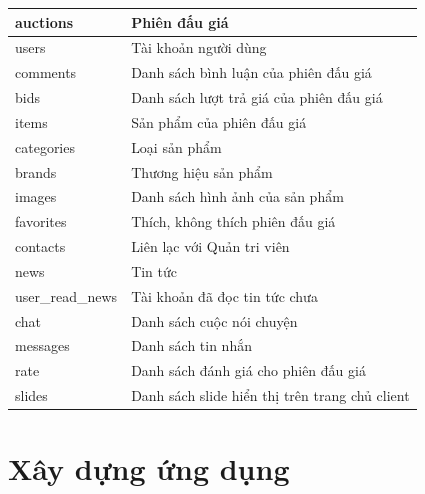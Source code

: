 \documentclass[../DoAn.tex]{subfiles}
\begin{document}
    \begin{supertabular}{| p{.30\textwidth} | p{.63\textwidth} |} 
    \hline
        auctions & Phiên đấu giá\\\hline
        users & Tài khoản người dùng\\\hline
        comments & Danh sách bình luận của phiên đấu giá\\\hline
        bids& Danh sách lượt trả giá của phiên đấu giá\\\hline
        items& Sản phẩm của phiên đấu giá\\\hline
        categories& Loại sản phẩm\\\hline
        brands& Thương hiệu sản phẩm\\\hline
        images& Danh sách hình ảnh của sản phẩm\\\hline
        favorites& Thích, không thích phiên đấu giá\\\hline
        contacts& Liên lạc với Quản tri viên\\\hline
        news& Tin tức\\\hline
        user\_read\_news& Tài khoản đã đọc tin tức chưa\\\hline
        chat& Danh sách cuộc nói chuyện\\\hline
        messages& Danh sách tin nhắn\\\hline
        rate& Danh sách đánh giá cho phiên đấu giá\\\hline
        slides & Danh sách slide hiển thị trên trang chủ client\\\hline
    \end{supertabular}
\section{Xây dựng ứng dụng}
\end{document}
